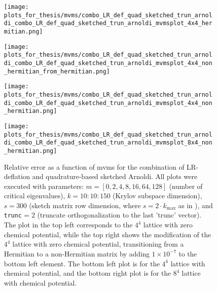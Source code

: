 \begin{figure}[H]
    \centering
    \begin{minipage}{0.45\textwidth}
        \centering
        \texttt{[image: plots\_for\_thesis/mvms/combo\_LR\_def\_quad\_sketched\_trun\_arnoldi\_combo\_LR\_def\_quad\_sketched\_trun\_arnoldi\_mvmsplot\_4x4\_hermitian.png]} %
    \end{minipage}%
    \hspace{0.02\textwidth} %
    \begin{minipage}{0.45\textwidth}
        \centering
        \texttt{[image: plots\_for\_thesis/mvms/combo\_LR\_def\_quad\_sketched\_trun\_arnoldi\_combo\_LR\_def\_quad\_sketched\_trun\_arnoldi\_mvmsplot\_4x4\_non\_hermitian\_from\_hermitian.png]} %
    \end{minipage}
    
    \vspace{0.02\textwidth} %
    
    \begin{minipage}{0.45\textwidth}
        \centering
        \texttt{[image: plots\_for\_thesis/mvms/combo\_LR\_def\_quad\_sketched\_trun\_arnoldi\_combo\_LR\_def\_quad\_sketched\_trun\_arnoldi\_mvmsplot\_4x4\_non\_hermitian.png]} %
    \end{minipage}%
    \hspace{0.02\textwidth} %
    \begin{minipage}{0.45\textwidth}
        \centering
        \texttt{[image: plots\_for\_thesis/mvms/combo\_LR\_def\_quad\_sketched\_trun\_arnoldi\_combo\_LR\_def\_quad\_sketched\_trun\_arnoldi\_mvmsplot\_8x4\_non\_hermitian.png]} %
    \end{minipage}
    
    \caption{\small Relative error as a function of mvms for the combination of LR-deflation and quadrature-based sketched Arnoldi. All plots were executed with parameters: $m = [0, 2, 4, 8, 16, 64, 128]$ (number of critical eigenvalues), $k = 10:10:150$ (Krylov subspace dimension), $s = 300$ (sketch matrix row dimension, where $s = 2 \cdot k_{\text{max}}$ as in \cite{41}), and \texttt{trunc} = 2 (truncate orthogonalization to the last 'trunc' vector). The plot in the top left corresponds to the $4^4$ lattice with zero chemical potential, while the top right shows the modification of the $4^4$ lattice with zero chemical potential, transitioning from a Hermitian to a non-Hermitian matrix by adding $1 \times 10^{-7}$ to the bottom left element. The bottom left plot is for the $4^4$ lattice with chemical potential, and the bottom right plot is for the $8^4$ lattice with chemical potential.}
    \label{fig:combo_LR+skectched_arnoldi_mvms_plot}
\end{figure}


